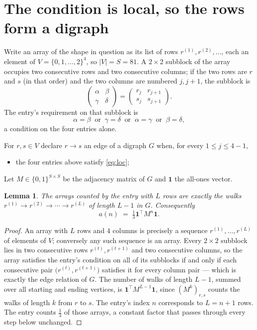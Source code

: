 \documentclass[11pt,a4paper]{article}
\theoremstyle{plain}
\newtheorem{lemma}[theorem]{Lemma}
\theoremstyle{definition}
\begin{document}
\section{The condition is local, so the rows form a digraph}

Write an array of the shape in question as its list of rows
$r^{(1)},r^{(2)},\dots$, each an element of
$V=\{0,1,\dots,2\}^{4}$, so $|V|=S=81$. A $2\times2$ subblock of the array
occupies two consecutive rows and two consecutive columns; if the two rows are $r$
and $s$ (in that order) and the two columns are numbered $j,j+1$,
the subblock is
\[
\begin{pmatrix}\alpha&\beta\\\gamma&\delta\end{pmatrix}=\begin{pmatrix}r_j&r_{j+1}\\s_j&s_{j+1}\end{pmatrix}.
\]
The entry's requirement on that subblock is
\begin{equation}\label{eq:loc}
\alpha=\beta\ \text{ or }\ \gamma=\delta\ \text{ or }\ \alpha=\gamma\ \text{ or }\ \beta=\delta,
\end{equation}
a condition on the four entries alone.

For $r,s\in V$ declare $r\to s$ an edge of a digraph $G$ when, for every
$1\le j\le 4-1$,
\begin{itemize}
\item the four entries above satisfy \eqref{eq:loc};

\end{itemize}
Let $M\in\{0,1\}^{S\times S}$ be the adjacency matrix of $G$ and $\mathbf{1}$ the
all-ones vector.

\begin{lemma}\label{lem:walk}
The arrays counted by the entry with $L$ rows are exactly the walks
$r^{(1)}\to r^{(2)}\to\cdots\to r^{(L)}$ of length $L-1$ in $G$. Consequently
\[
a(n)\;=\;\tfrac1{3}\mathbf{1}^{\!\top}M^{n}\mathbf{1} .
\]
\end{lemma}

\begin{proof}
An array with $L$ rows and $4$ columns is precisely a sequence
$r^{(1)},\dots,r^{(L)}$ of elements of $V$; conversely any such sequence is an array.
Every $2\times2$ subblock lies in two consecutive rows $r^{(t)},r^{(t+1)}$ and two
consecutive columns, so the array satisfies the entry's condition on all of its subblocks
if and only if each consecutive pair $\bigl(r^{(t)},r^{(t+1)}\bigr)$ satisfies it for
every column pair --- which is exactly the edge relation of $G$. The number of walks of
length $L-1$, summed over all starting and ending vertices, is
$\mathbf{1}^{\!\top}M^{L-1}\mathbf{1}$, since $(M^{k})_{r,s}$ counts the walks of
length $k$ from $r$ to $s$. The entry's index $n$ corresponds to $L=n+1$ rows. The entry counts $\tfrac1{3}$ of those arrays, a constant factor that passes through every step below unchanged.
\end{proof}
\end{document}
